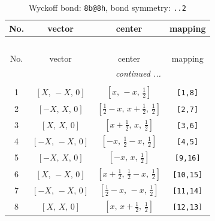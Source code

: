 \documentclass[fleqn,8pt]{jsarticle}
\begin{document}
\begin{longtable}{cccc}
\caption{Wyckoff bond: {\tt 8b@8h}, bond symmetry: {\tt ..2}}
 \\
 \hline \hline
No. & vector & center & mapping \\ \hline \endfirsthead

\multicolumn{3}{l}{\tablename\ \thetable{}} \\
 \hline \hline
No. & vector & center & mapping \\ \hline \endhead

 \hline \hline
\multicolumn{3}{r}{\footnotesize\it continued ...} \\ \endfoot

 \hline \hline
\multicolumn{3}{r}{} \\ \endlastfoot

1 & $\left[ X,\, - X,\, 0 \right]$ & $\left[ x,\, - x,\, \frac{1}{2} \right]$ & {\tt [1,8]} \\ \hline
2 & $\left[ - X,\, X,\, 0 \right]$ & $\left[ \frac{1}{2} - x,\, x + \frac{1}{2},\, \frac{1}{2} \right]$ & {\tt [2,7]} \\ \hline
3 & $\left[ X,\, X,\, 0 \right]$ & $\left[ x + \frac{1}{2},\, x,\, \frac{1}{2} \right]$ & {\tt [3,6]} \\ \hline
4 & $\left[ - X,\, - X,\, 0 \right]$ & $\left[ - x,\, \frac{1}{2} - x,\, \frac{1}{2} \right]$ & {\tt [4,5]} \\ \hline
5 & $\left[ - X,\, X,\, 0 \right]$ & $\left[ - x,\, x,\, \frac{1}{2} \right]$ & {\tt [9,16]} \\ \hline
6 & $\left[ X,\, - X,\, 0 \right]$ & $\left[ x + \frac{1}{2},\, \frac{1}{2} - x,\, \frac{1}{2} \right]$ & {\tt [10,15]} \\ \hline
7 & $\left[ - X,\, - X,\, 0 \right]$ & $\left[ \frac{1}{2} - x,\, - x,\, \frac{1}{2} \right]$ & {\tt [11,14]} \\ \hline
8 & $\left[ X,\, X,\, 0 \right]$ & $\left[ x,\, x + \frac{1}{2},\, \frac{1}{2} \right]$ & {\tt [12,13]} \\
\end{longtable}
\renewcommand{\arraystretch}{1.2}
\end{document}
